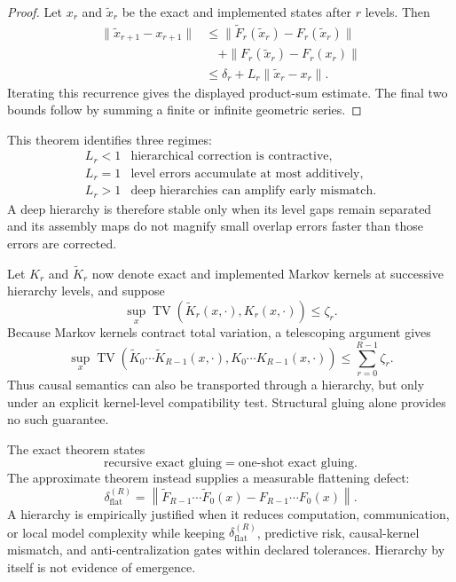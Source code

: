 \begin{proof}
Let \(x_r\) and \(\widetilde x_r\) be the exact and implemented states after
\(r\) levels. Then
\[
\begin{aligned}
\|\widetilde x_{r+1}-x_{r+1}\|
&\leq
\|\widetilde F_r(\widetilde x_r)-F_r(\widetilde x_r)\|\\
&\quad+
\|F_r(\widetilde x_r)-F_r(x_r)\|\\
&\leq
\delta_r+L_r\|\widetilde x_r-x_r\|.
\end{aligned}
\]
Iterating this recurrence gives the displayed product-sum estimate. The final
two bounds follow by summing a finite or infinite geometric series.
\end{proof}

This theorem identifies three regimes:
\[
\begin{array}{ll}
L_r<1
&\text{hierarchical correction is contractive},\\
L_r=1
&\text{level errors accumulate at most additively},\\
L_r>1
&\text{deep hierarchies can amplify early mismatch}.
\end{array}
\]
A deep hierarchy is therefore stable only when its level gaps remain separated
and its assembly maps do not magnify small overlap errors faster than those
errors are corrected.


Let \(K_r\) and \(\widetilde K_r\) now denote exact and implemented Markov
kernels at successive hierarchy levels, and suppose
\[
\sup_x
\operatorname{TV}
\left(
\widetilde K_r(x,\cdot),
K_r(x,\cdot)
\right)
\leq
\zeta_r.
\]
Because Markov kernels contract total variation, a telescoping argument gives
\[
\boxed{
\sup_x
\operatorname{TV}
\left(
\widetilde K_0\cdots\widetilde K_{R-1}(x,\cdot),
K_0\cdots K_{R-1}(x,\cdot)
\right)
\leq
\sum_{r=0}^{R-1}\zeta_r.
}
\]
Thus causal semantics can also be transported through a hierarchy, but only
under an explicit kernel-level compatibility test. Structural gluing alone
provides no such guarantee.


The exact theorem states
\[
\boxed{
\text{recursive exact gluing}
=
\text{one-shot exact gluing}.
}
\]
The approximate theorem instead supplies a measurable flattening defect:
\[
\boxed{
\delta_{\mathrm{flat}}^{(R)}
=
\left\|
\widetilde F_{R-1}\cdots\widetilde F_0(x)
-
F_{R-1}\cdots F_0(x)
\right\|.
}
\]
A hierarchy is empirically justified when it reduces computation,
communication, or local model complexity while keeping
\(\delta_{\mathrm{flat}}^{(R)}\), predictive risk, causal-kernel mismatch, and
anti-centralization gates within declared tolerances. Hierarchy by itself is
not evidence of emergence.

